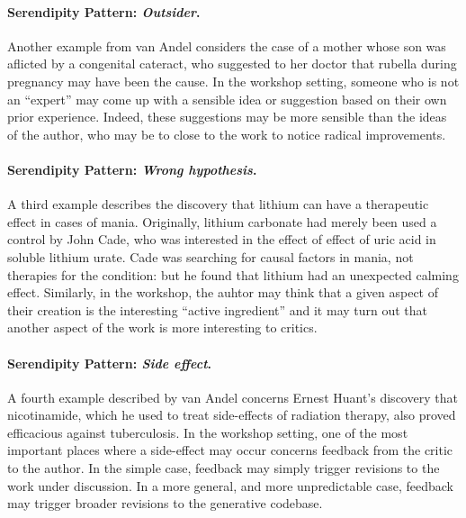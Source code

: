 \vspace{-3ex}
\paragraph{Serendipity Pattern: \emph{Outsider}.}  Another example from van Andel considers
the case of a mother whose son was aflicted by a congenital cateract,
who suggested to her doctor that rubella during pregnancy may have
been the cause.  In the workshop setting, someone who is not an
``expert'' may come up with a sensible idea or suggestion based on
their own prior experience.  Indeed, these suggestions may be more
sensible than the ideas of the author, who may be to close to the work
to notice radical improvements.  

\vspace{-3ex}
\paragraph{Serendipity Pattern: \emph{Wrong hypothesis}.}  A third example describes the discovery that lithium
can have a therapeutic effect in cases of mania.  Originally, lithium
carbonate had merely been used a control by John Cade, who was
interested in the effect of effect of uric acid in soluble lithium
urate.  Cade was searching for causal factors in mania, not therapies
for the condition: but he found that lithium had an unexpected calming
effect.  Similarly, in the workshop, the auhtor may think that a given
aspect of their creation is the interesting ``active ingredient'' and
it may turn out that another aspect of the work is more interesting to
critics.

\vspace{-3ex}
\paragraph{Serendipity Pattern: \emph{Side effect}.}  A fourth example described by van Andel concerns
Ernest Huant's discovery that nicotinamide, which he used to treat
side-effects of radiation therapy, also proved efficacious against
tuberculosis.  In the workshop setting, one of the most important
places where a side-effect may occur concerns feedback from the critic
to the author.  In the simple case, feedback may simply trigger
revisions to the work under discussion.  In a more general, and more
unpredictable case, feedback may trigger broader revisions to the
generative codebase.  

\medskip

